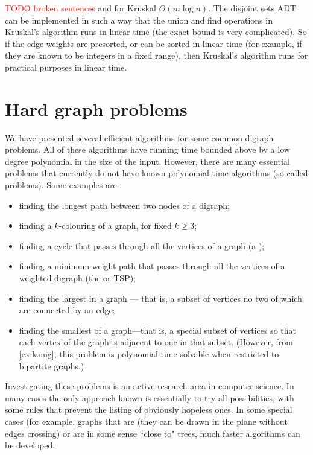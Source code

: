 \textcolor{red}{TODO broken sentences}
 and for Kruskal $O(m \log n)$. The disjoint sets
ADT can be implemented in such a way that the union and find operations
in Kruskal's algorithm runs in  linear time (the exact bound
is very complicated). So if the edge weights are presorted, or can be
sorted in linear time (for example, if they are known to be integers in
a fixed range), then Kruskal's algorithm runs for practical purposes in
linear time.



\chapter{Hard graph problems}%
\label{sec:hardgraph}
We have presented several efficient algorithms for some common digraph
problems. All of these algorithms have running time bounded above by a low
degree polynomial in the size of the input. However, there are many
essential problems that currently do not have known polynomial-time
algorithms (so-called  problems). Some examples
are:
\begin{itemize}
\item finding the longest path between two nodes of a digraph;
\item finding a $k$-colouring of a graph, for fixed $k \geq 3$;
\item finding a cycle that passes through all the vertices of
a graph (a );
\item finding a
minimum weight path that passes through all the vertices of a weighted
digraph (the  or TSP);
\item finding the largest  in a graph --- that is, 
a subset of vertices no two of which are connected by an edge;
\item finding the smallest  of a graph---that is, a special subset of
vertices so that each vertex of the graph is adjacent to one in that
subset. (However, from \cref{ex:konig}, this problem 
is polynomial-time solvable when restricted to bipartite graphs.)
\end{itemize}

Investigating these problems is an active research area in computer
science. In many cases the only approach known is essentially to try
all possibilities, with some rules that prevent the listing of obviously
hopeless ones. In some special cases (for example, graphs that are 
 (they can be drawn in the plane without edges crossing) 
or are in some sense ``close to" trees, much faster algorithms can be developed.

